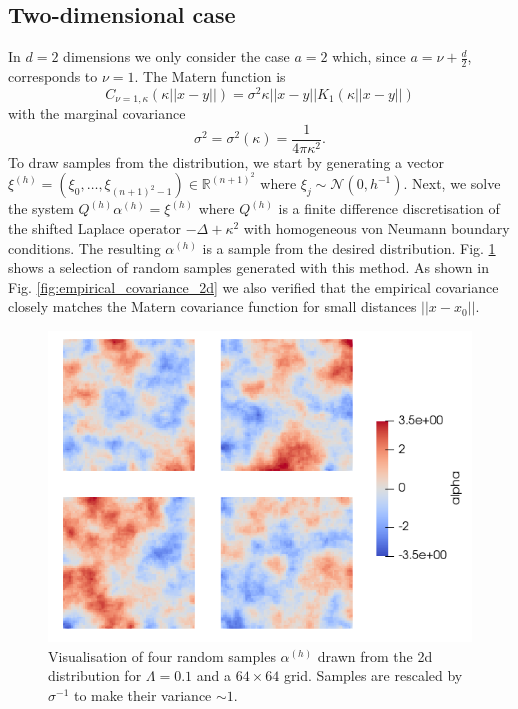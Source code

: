 \documentclass[11pt]{article}
\begin{document}
\subsection{Two-dimensional case}
In $d=2$ dimensions we only consider the case $a=2$ which, since $a=\nu+\frac{d}{2}$, corresponds to $\nu=1$. The Matern function is
\begin{equation}
    C_{\nu=1,\kappa}(\kappa||x-y||) = \sigma^2 \kappa||x-y|| K_1(\kappa||x-y||)
\end{equation}
with the marginal covariance
\begin{equation}
    \sigma^2 = \sigma^2(\kappa) = \frac{1}{4\pi\kappa^2}.
\end{equation}
To draw samples from the distribution, we start by generating a vector $\xi^{(h)}=(\xi_0,\dots,\xi_{(n+1)^2-1})\in\mathbb{R}^{(n+1)^2}$ where $\xi_j\sim\mathcal{N}(0,h^{-1})$. Next, we solve the system $Q^{(h)}\alpha^{(h)}=\xi^{(h)}$ where $Q^{(h)}$ is a finite difference discretisation of the shifted Laplace operator $-\Delta+\kappa^2$ with homogeneous von Neumann boundary conditions. The resulting $\alpha^{(h)}$ is a sample from the desired distribution. Fig. \ref{fig:samples_2d} shows a selection of random samples generated with this method. As shown in Fig. \ref{fig:empirical_covariance_2d} we also verified that the empirical covariance closely matches the Matern covariance function for small distances $||x-x_0||$.
\begin{figure}
\begin{center}
\includegraphics[width=0.8\linewidth]{figures/samples_2d.png}
\caption{Visualisation of four random samples $\alpha^{(h)}$ drawn from the 2d distribution for $\Lambda=0.1$ and a $64\times 64$ grid. Samples are rescaled by $\sigma^{-1}$ to make their variance $\sim 1$.}
\label{fig:samples_2d}
\end{center}
\end{figure}
\end{document}
